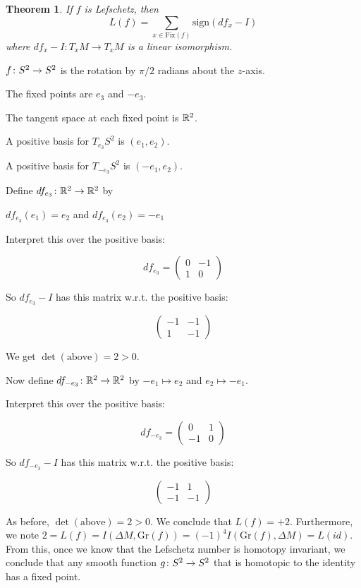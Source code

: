 \documentclass[11pt]{amsbook}
\theoremstyle{mystyle} %
\newtheorem{thrm}[thm]{Theorem}
\numberwithin{thm}{section}
\newcommand{\Fix}{\text{Fix}}
\newcommand{\Gr}{\text{Gr}}
\begin{document}
\begin{thrm}
	If $f$ is Lefschetz, then $$L(f) = \sum_{x \in \Fix(f)}
        \text{sign}(df_x - I)$$ where $df_x - I : T_xM
        \overset{~}{\to} T_xM$ is a linear isomorphism.
\end{thrm}
\begin{example}
	$f \colon S^2 \to S^2$ is the rotation by $\pi/2$ radians about the $z$-axis.

	The fixed points are $e_3$ and $-e_3$.

	The tangent space at each fixed point is ${\mathbb R}^2$.

	A positive basis for $T_{e_3}S^2$ is $(e_1, e_2)$.

	A positive basis for $T_{-e_3}S^2$ is $(-e_1, e_2)$.

	Define $df_{e_3} \colon {\mathbb R}^2 \to {\mathbb R}^2$ by

	$df_{e_3}(e_1) = e_2$ and $df_{e_3}(e_2) = -e_1$

	Interpret this over the positive basis:

	$$df_{e_3} = \begin{pmatrix}
	0 & -1 \\
	1 & 0
	\end{pmatrix}$$

	So $df_{e_3} - I$ has this matrix w.r.t. the positive basis:

	$$\begin{pmatrix}
	-1 & -1 \\
	1 & -1
	\end{pmatrix}$$

	We get $\det(\text{above}) = 2 > 0$.

	Now define $df_{-e_3} \colon {\mathbb R}^2 \to {\mathbb R}^2$ by
	$-e_1 \mapsto e_2$ and
	$e_2 \mapsto -e_1$.

	Interpret this over the positive basis:

	$$df_{-e_3} = \begin{pmatrix}
	0 & 1 \\
	-1 & 0
	\end{pmatrix}$$

	So $df_{-e_3} - I$ has this matrix w.r.t. the positive basis:

	$$\begin{pmatrix}
	-1 & 1 \\
	-1 & -1
	\end{pmatrix}$$

	As before, $\det(\text{above}) = 2 > 0$. We conclude that
        $L(f) = +2$. Furthermore, we note \(2 = L(f) = I(\Delta M,
        \Gr(f)) = (-1)^4 I(\Gr(f), \Delta M) = L(id)\).
        From this, once we know that the Lefschetz number is homotopy
        invariant,
        we conclude that any smooth function \(g \colon S^2 \to S^2\)
        that is homotopic to the identity has a fixed point.
\end{example}
\end{document}
